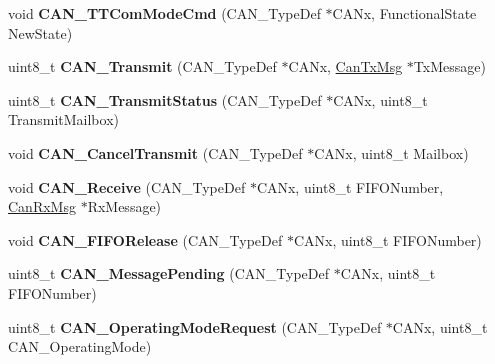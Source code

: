 \begin{DoxyCompactItemize}
\item 
\hypertarget{group__CAN__Exported__Functions_ga94740177bab153ca5b102d122f9a8cca}{
void {\bfseries CAN\_\-TTComModeCmd} (CAN\_\-TypeDef $\ast$CANx, FunctionalState NewState)}
\label{group__CAN__Exported__Functions_ga94740177bab153ca5b102d122f9a8cca}

\item 
\hypertarget{group__CAN__Exported__Functions_gaccfcb81f76f58400077c7b2d8641dd83}{
uint8\_\-t {\bfseries CAN\_\-Transmit} (CAN\_\-TypeDef $\ast$CANx, \hyperlink{structCanTxMsg}{CanTxMsg} $\ast$TxMessage)}
\label{group__CAN__Exported__Functions_gaccfcb81f76f58400077c7b2d8641dd83}

\item 
\hypertarget{group__CAN__Exported__Functions_ga68ab05a0a6cdfcc2b6f6b6b2c10848e2}{
uint8\_\-t {\bfseries CAN\_\-TransmitStatus} (CAN\_\-TypeDef $\ast$CANx, uint8\_\-t TransmitMailbox)}
\label{group__CAN__Exported__Functions_ga68ab05a0a6cdfcc2b6f6b6b2c10848e2}

\item 
\hypertarget{group__CAN__Exported__Functions_ga81106cdf5395a1947bfc87ec1685829e}{
void {\bfseries CAN\_\-CancelTransmit} (CAN\_\-TypeDef $\ast$CANx, uint8\_\-t Mailbox)}
\label{group__CAN__Exported__Functions_ga81106cdf5395a1947bfc87ec1685829e}

\item 
\hypertarget{group__CAN__Exported__Functions_ga351b90bb8a3bb0c846f85bbd56ef4dc8}{
void {\bfseries CAN\_\-Receive} (CAN\_\-TypeDef $\ast$CANx, uint8\_\-t FIFONumber, \hyperlink{structCanRxMsg}{CanRxMsg} $\ast$RxMessage)}
\label{group__CAN__Exported__Functions_ga351b90bb8a3bb0c846f85bbd56ef4dc8}

\item 
\hypertarget{group__CAN__Exported__Functions_ga1bc3b39471e579b4101624c33d27918b}{
void {\bfseries CAN\_\-FIFORelease} (CAN\_\-TypeDef $\ast$CANx, uint8\_\-t FIFONumber)}
\label{group__CAN__Exported__Functions_ga1bc3b39471e579b4101624c33d27918b}

\item 
\hypertarget{group__CAN__Exported__Functions_ga7100459a95ce1b3cfe8ab15e112029fe}{
uint8\_\-t {\bfseries CAN\_\-MessagePending} (CAN\_\-TypeDef $\ast$CANx, uint8\_\-t FIFONumber)}
\label{group__CAN__Exported__Functions_ga7100459a95ce1b3cfe8ab15e112029fe}

\item 
\hypertarget{group__CAN__Exported__Functions_gab2a3630e9e3024114eb117d14e514208}{
uint8\_\-t {\bfseries CAN\_\-OperatingModeRequest} (CAN\_\-TypeDef $\ast$CANx, uint8\_\-t CAN\_\-OperatingMode)}
\label{group__CAN__Exported__Functions_gab2a3630e9e3024114eb117d14e514208}


\end{DoxyCompactItemize}

